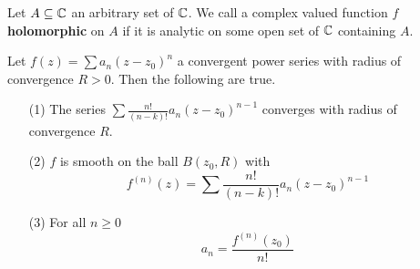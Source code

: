 \begin{definition}
    Let $A \subseteq \mathbb{C}$ an arbitrary set of  $\mathbb{C}$. We call a complex valued
    function $f$ \textbf{holomorphic} on $A$ if it is analytic on some open set of
     $\mathbb{C}$ containing  $A$.
\end{definition}

\begin{theorem}\label{3.2.4}
    Let $f(z)=\sum{a_n(z-z_0)^n}$ a convergent power series with radius of
    convergence $R>0$. Then the following are true.
    \begin{enumerate}
        \item[(1)] The series $\sum{\frac{n!}{(n-k)!}a_n(z-z_0)^{n-1}}$
            converges with radius of convergence $R$.

        \item[(2)] $f$ is smooth on the ball  $B(z_0,R)$ with
            \begin{equation*}
                f^{(n)}(z)=\sum{\frac{n!}{(n-k)!}a_n(z-z_0)^{n-1}}
            \end{equation*}

        \item[(3)] For all $n \geq 0$
            \begin{equation*}
                a_n=\frac{f^{(n)}(z_0)}{n!}
            \end{equation*}
    \end{enumerate}
\end{theorem}

